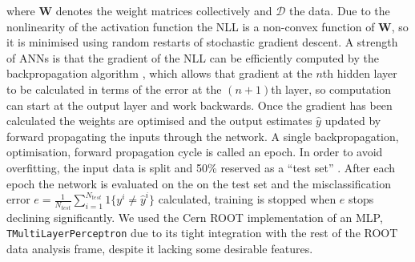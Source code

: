 where \textbf{W} denotes the weight matrices collectively and $\mathcal{D}$ the data.
Due to the nonlinearity of the activation function the NLL is a non-convex function of \textbf{W}, so it is minimised using random restarts of stochastic gradient descent. 
A strength of ANNs is that the gradient of the NLL can be efficiently computed by the backpropagation algorithm \cite{murphy2012machine}, which allows that gradient at the $n$th hidden layer to be calculated in terms of the error at the $(n+1)$th layer, so computation can start at the output layer and work backwards.
Once the gradient has been calculated the weights are optimised and the output estimates $\hat{y}$ updated by forward propagating the inputs through the network. A single backpropagation, optimisation, forward propagation cycle is called an epoch.
In order to avoid overfitting, the input data is split and 50\% reserved as a ``test set'' . 
After each epoch the network is evaluated on the on the test set and the misclassification error 
$e = \frac{1}{N_{test}}\sum_{i = 1}^{N_{test}} 1\{y^i \ne \hat{y}^i \} $
calculated, training is stopped when $e$ stops declining significantly.
We used the Cern ROOT \cite{citeulike:363715} implementation of an MLP, \texttt{TMultiLayerPerceptron} due to its tight integration with the rest of the ROOT data analysis frame, despite it lacking some desirable features.